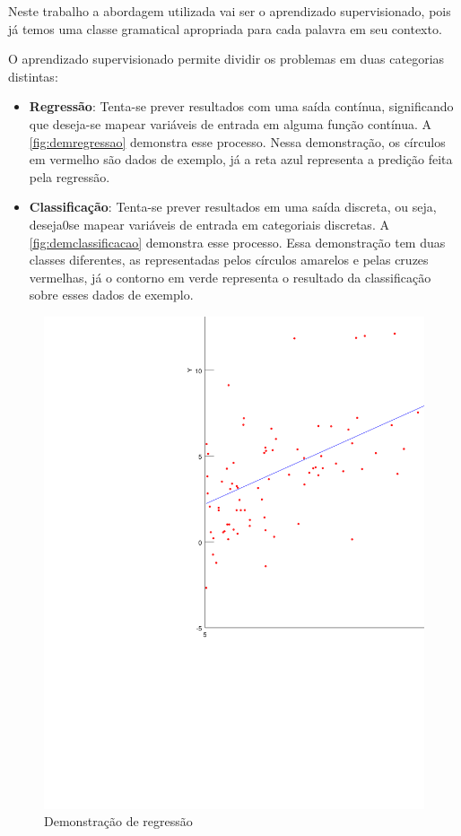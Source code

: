 Neste trabalho a abordagem utilizada vai ser o aprendizado supervisionado, pois já temos uma classe gramatical apropriada para cada palavra em seu contexto.

O aprendizado supervisionado permite dividir os problemas em duas categorias distintas:


\begin{itemize}
	\item \textbf{Regressão}: Tenta-se prever resultados com uma saída contínua, significando que deseja-se mapear variáveis de entrada em alguma função contínua. A \autoref{fig:demregressao} demonstra esse processo. Nessa demonstração, os círculos em vermelho são dados de exemplo, já a reta azul representa a predição feita pela regressão.
	\item \textbf{Classificação}:  Tenta-se prever resultados em uma saída discreta, ou seja, deseja0se mapear variáveis de entrada em categoriais discretas. A \autoref{fig:demclassificacao} demonstra esse processo. Essa demonstração tem duas classes diferentes, as representadas pelos círculos amarelos e pelas cruzes vermelhas, já o contorno em verde representa o resultado da classificação sobre esses dados de exemplo.
\end{itemize}


\begin{figure}[htb]
	  \caption{Demonstração de regressão}\label{fig:demregressao}
	  \begin{center}
	      \includegraphics[scale=0.75]{img/regressao2}
	  \end{center}
\end{figure}

